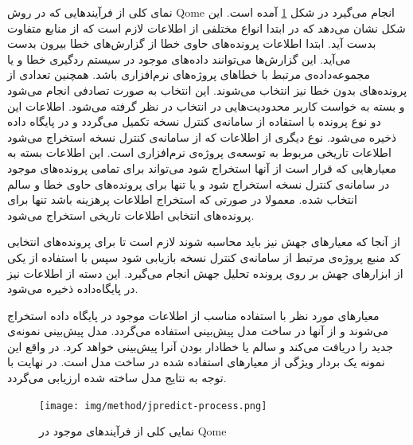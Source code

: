 نمای کلی از فرآیند‌هایی که در روش Qome انجام می‌گیرد در شکل \ref{fig:jpredict-process}  آمده است. این شکل نشان می‌دهد که در ابتدا انواع مختلفی از اطلاعات لازم است که از منابع متفاوت بدست آید. ابتدا اطلاعات پرونده‌های حاوی خطا از گزارش‌های خطا بیرون بدست می‌آید. این گزارش‌ها می‌توانند داده‌های موجود در سیستم ردگیری خطا و یا  مجموعه‌داده‌ی مرتبط با خطاهای پروژه‌های نرم‌افزاری باشد. همچنین تعدادی از پرونده‌های بدون خطا نیز انتخاب می‌شوند. این انتخاب به صورت تصادفی انجام می‌شود و بسته به خواست کاربر محدودیت‌هایی در انتخاب در نظر گرفته می‌شود. اطلاعات این دو نوع پرونده با استفاده از سامانه‌ی کنترل نسخه تکمیل می‌گردد و در پایگاه داده ذخیره می‌شود. نوع دیگری از اطلاعات که از سامانه‌ی کنترل نسخه استخراج می‌شود اطلاعات تاریخی مربوط به توسعه‌ی پروژه‌ی نرم‌افزاری است. این اطلاعات بسته به معیارهایی که قرار است از آنها استخراج شود می‌تواند برای تمامی پرونده‌های موجود در سامانه‌ی کنترل نسخه استخراج شود و یا تنها برای پرونده‌های حاوی خطا و سالم انتخاب شده. معمولا در صورتی که استخراج اطلاعات پرهزینه باشد تنها برای پرونده‌های انتخابی اطلاعات تاریخی استخراج می‌شود. 

از آنجا که معیارهای جهش نیز باید محاسبه شوند لازم است تا برای پرونده‌های انتخابی کد منبع پروژه‌ی  مرتبط از سامانه‌ی کنترل نسخه بازیابی شود سپس با استفاده از یکی از ابزارهای جهش بر روی  پرونده تحلیل جهش انجام می‌گیرد. این دسته از اطلاعات  نیز در پایگاه‌داده ذخیره می‌شود. 

معیارهای مورد نظر با استفاده  مناسب از اطلاعات موجود در پایگاه داده استخراج می‌شوند و از آنها در ساخت مدل پیش‌بینی استفاده می‌گردد. مدل پیش‌بینی نمونه‌ی جدید را دریافت می‌کند و سالم یا خطادار بودن آنرا پیش‌بینی خواهد کرد. در واقع این نمونه یک بردار ویژگی از معیارهای استفاده شده در ساخت مدل است. در نهایت  با توجه به نتایج مدل ساخته شده ارزیابی می‌گردد.

\begin{figure}[H]
	\centering
	\texttt{[image: img/method/jpredict-process.png]}
	\caption{ نمایی کلی از فرآیند‌های موجود در Qome}
	\label{fig:jpredict-process}
\end{figure}

